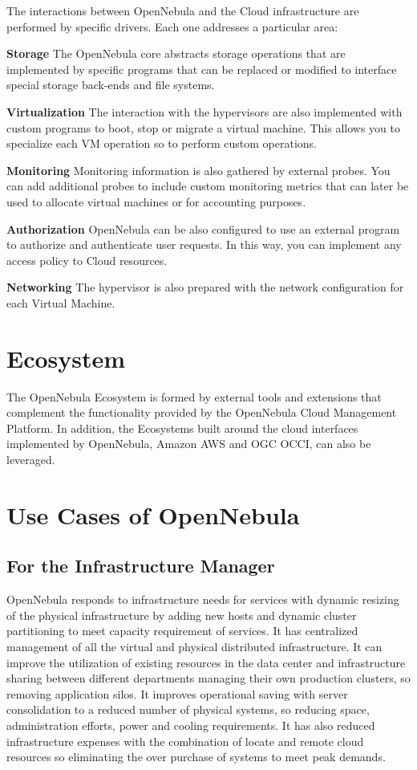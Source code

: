 \documentclass[9pt,twocolumn,twoside]{styles/osajnl}
\begin{document}
The interactions between OpenNebula and the {Cloud 
infrastructure}\cite{www-opennebula-infraintegration} are 
performed by specific drivers. Each one addresses a particular area:

\textbf{Storage} The OpenNebula core abstracts storage 
operations that are implemented by specific programs that can be 
replaced or modified to interface special storage back-ends and file 
systems.

\textbf{Virtualization} The interaction with the hypervisors are also 
implemented with custom programs to boot, stop or migrate a virtual 
machine. This allows you to specialize each VM operation so to 
perform custom operations.

\textbf{Monitoring} Monitoring information is also gathered by 
external probes. You can add additional probes to include custom 
monitoring metrics that can later be used to allocate virtual 
machines or for accounting purposes.

\textbf{Authorization} OpenNebula can be also configured to use an 
external program to authorize and authenticate user requests. In this 
way, you can implement any access policy to Cloud resources.

\textbf{Networking} The hypervisor is also prepared with the network 
configuration for each Virtual Machine.

\section{Ecosystem}

The {OpenNebula Ecosystem}\cite{www-opennebula-ecosystem} is formed 
by external tools and extensions 
that complement the functionality provided by the OpenNebula Cloud 
Management Platform. In addition, the Ecosystems built around the 
cloud interfaces implemented by OpenNebula, Amazon AWS and OGC OCCI, 
can also be leveraged. 

\section{Use Cases of OpenNebula}

\subsection{For the Infrastructure Manager}

OpenNebula responds to infrastructure needs for services with 
dynamic resizing of the physical infrastructure by adding new hosts 
and dynamic cluster partitioning to meet capacity requirement of 
services. It has centralized management of all the virtual and 
physical distributed infrastructure. It can improve the utilization 
of existing resources in the data center and infrastructure sharing 
between different departments managing their own production clusters, 
so removing application silos. It improves operational saving with 
server consolidation to a reduced number of physical systems, so 
reducing space, administration efforts, power and cooling 
requirements. It has also reduced infrastructure expenses with the 
combination of locate and remote cloud resources so eliminating the 
over purchase of systems to meet peak demands.
\end{document}
